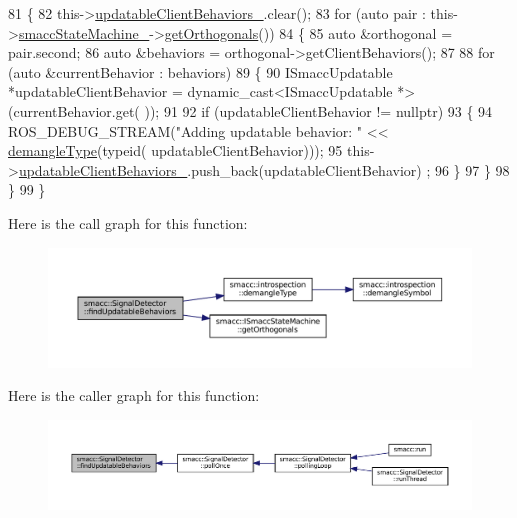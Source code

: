 \begin{DoxyCode}
81 \{
82     this->\hyperlink{classsmacc_1_1SignalDetector_a9dce129da8c8a9971416a8f498132c23}{updatableClientBehaviors\_}.clear();
83     \textcolor{keywordflow}{for} (\textcolor{keyword}{auto} pair : this->\hyperlink{classsmacc_1_1SignalDetector_a46025de6ac7b5980e22144f9703236a4}{smaccStateMachine\_}->\hyperlink{classsmacc_1_1ISmaccStateMachine_a7f5b2882dbd077584767cb2533ed3c49}{getOrthogonals}())
84     \{
85         \textcolor{keyword}{auto} &orthogonal = pair.second;
86         \textcolor{keyword}{auto} &behaviors = orthogonal->getClientBehaviors();
87 
88         \textcolor{keywordflow}{for} (\textcolor{keyword}{auto} &currentBehavior : behaviors)
89         \{
90             ISmaccUpdatable *updatableClientBehavior = \textcolor{keyword}{dynamic\_cast<}ISmaccUpdatable *\textcolor{keyword}{>}(currentBehavior.get(
      ));
91 
92             \textcolor{keywordflow}{if} (updatableClientBehavior != \textcolor{keyword}{nullptr})
93             \{
94                 ROS\_DEBUG\_STREAM(\textcolor{stringliteral}{"Adding updatable behavior: "} << \hyperlink{namespacesmacc_1_1introspection_a670e39ccea29952859df4e2d0e45077b}{demangleType}(\textcolor{keyword}{typeid}(
      updatableClientBehavior)));
95                 this->\hyperlink{classsmacc_1_1SignalDetector_a9dce129da8c8a9971416a8f498132c23}{updatableClientBehaviors\_}.push\_back(updatableClientBehavior)
      ;
96             \}
97         \}
98     \}
99 \}
\end{DoxyCode}
Here is the call graph for this function\+:
\nopagebreak
\begin{figure}[H]
\begin{center}
\leavevmode
\includegraphics[width=350pt]{classsmacc_1_1SignalDetector_a7e1301b9d23a522f18385368421c83f5_cgraph}
\end{center}
\end{figure}
Here is the caller graph for this function\+:
\nopagebreak
\begin{figure}[H]
\begin{center}
\leavevmode
\includegraphics[width=350pt]{classsmacc_1_1SignalDetector_a7e1301b9d23a522f18385368421c83f5_icgraph}
\end{center}
\end{figure}
\mbox{\label{classsmacc_1_1SignalDetector_a47ec2df560e2e33758ce3975bece9385}} 
